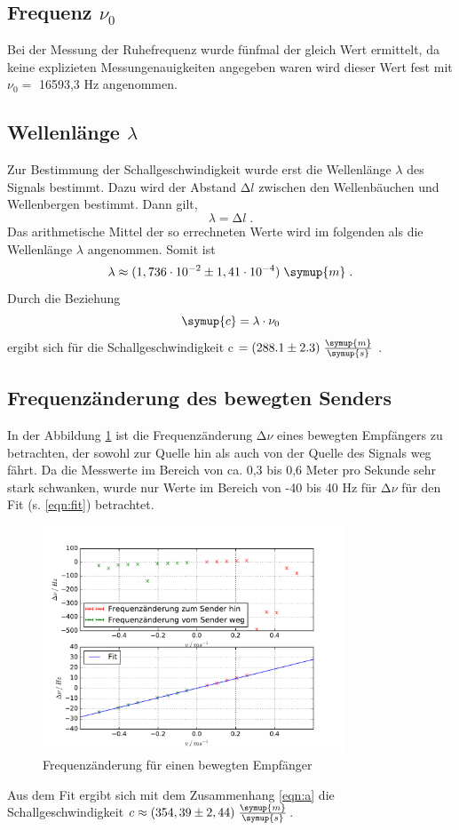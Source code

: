 \subsection{Frequenz \texorpdfstring{$\nu_0$}{[math]}}
Bei der Messung der Ruhefrequenz wurde fünfmal der gleich Wert ermittelt, da
keine explizieten Messungenauigkeiten angegeben waren wird dieser Wert fest
mit $\nu_0 = $ 16593,3 Hz angenommen.
\subsection{Wellenlänge \texorpdfstring{$\lambda$}{[math]}}
Zur Bestimmung der Schallgeschwindigkeit wurde erst die Wellenlänge $\lambda$ des Signals
bestimmt. Dazu wird der Abstand $\increment l$ zwischen den Wellenbäuchen und Wellenbergen
bestimmt. Dann gilt,
\begin{equation*}
  \lambda = \increment l \;.
\end{equation*}
Das arithmetische Mittel der so errechneten Werte wird im folgenden als die
Wellenlänge $\lambda$ angenommen. Somit ist
\begin{equation*}
  \lambda \approx (1,736\cdot 10^{-2} \pm 1,41\cdot10^{-4})\;\symup{m}\; .
\end{equation*}
Durch die Beziehung
\begin{equation*}
  \symup{c} = \lambda \cdot \nu_0
\end{equation*}
ergibt sich für die Schallgeschwindigkeit c $ = (288.1 \pm 2.3)\;
 \frac{\symup{m}}{\symup{s}}$ .
\subsection{Frequenzänderung des bewegten Senders}
In der Abbildung \ref{fig:d} ist die Frequenzänderung $\increment \nu$ eines
bewegten Empfängers zu betrachten, der sowohl zur Quelle hin als auch von der
Quelle des Signals weg fährt. Da die Messwerte im Bereich von ca. 0,3 bis 0,6
Meter pro Sekunde sehr stark schwanken, wurde nur Werte im Bereich von -40 bis
40 Hz für $\increment \nu $ für den Fit (s. \eqref{eqn:fit}) betrachtet.
\begin{figure}
  \centering
  \includegraphics[width=0.8\textwidth]{plots/dplot.pdf}
  \caption{Frequenzänderung für einen bewegten Empfänger}
  \label{fig:d}
\end{figure}
Aus dem Fit ergibt sich mit dem Zusammenhang \eqref{eqn:a} die
Schallgeschwindigkeit $c \approx (354,39 \pm 2,44)\; \frac{\symup{m}}{\symup{s}}$.


